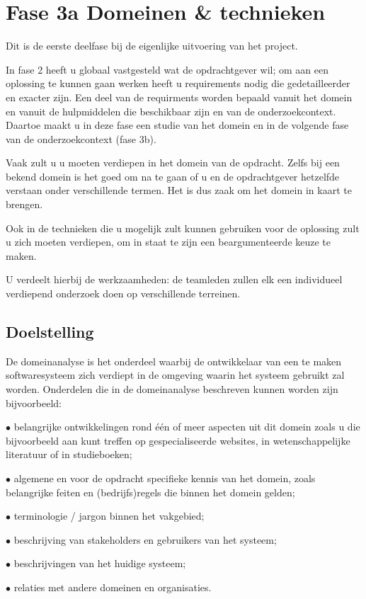 \section{Fase 3a Domeinen \& technieken}
Dit is de eerste deelfase bij de eigenlijke uitvoering van het project.

In fase 2 heeft u globaal vastgesteld wat de opdrachtgever wil; om
aan een oplossing te kunnen gaan werken heeft u requirements nodig
die gedetailleerder en exacter zijn. Een deel van de requirments
worden bepaald vanuit het domein en vanuit de hulpmiddelen die
beschikbaar zijn en van de onderzoekcontext. Daartoe maakt u in
deze fase een studie van het domein en in de volgende fase van
de onderzoekcontext (fase 3b).

Vaak zult u u moeten verdiepen in het domein van de opdracht.
Zelfs bij een bekend domein is het goed om na te gaan of u en de
opdrachtgever hetzelfde verstaan onder verschillende termen. Het is
dus zaak om het domein in kaart te brengen.

Ook in de technieken die u mogelijk zult kunnen gebruiken voor de
oplossing zult u zich moeten verdiepen, om in staat te zijn een
beargumenteerde keuze te maken.

U verdeelt hierbij de werkzaamheden: de teamleden zullen elk een
individueel verdiepend onderzoek doen op verschillende terreinen.

\subsection{Doelstelling}
De domeinanalyse is het onderdeel waarbij de ontwikkelaar van een te maken
softwaresysteem zich verdiept in de omgeving waarin het systeem gebruikt zal
worden.
Onderdelen die in de domeinanalyse beschreven kunnen worden zijn bijvoorbeeld:

    $\bullet$ belangrijke ontwikkelingen rond één of meer aspecten uit dit domein zoals u
die bijvoorbeeld aan kunt treffen op gespecialiseerde websites, in
wetenschappelijke literatuur of in studieboeken;

    $\bullet$ algemene en voor de opdracht specifieke kennis van het domein, zoals
belangrijke feiten en (bedrijfs)regels die binnen het domein gelden;

    \par $\bullet$ terminologie / jargon binnen het vakgebied;
    \par $\bullet$ beschrijving van stakeholders en gebruikers van het systeem;
    \par $\bullet$ beschrijvingen van het huidige systeem;
    \par $\bullet$ relaties met andere domeinen en organisaties.

